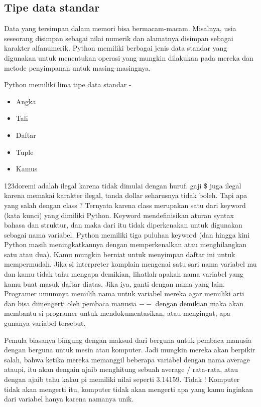 \subsection{Tipe data standar}
Data yang tersimpan dalam memori bisa bermacam-macam. Misalnya, usia seseorang disimpan sebagai nilai numerik dan alamatnya disimpan sebagai karakter alfanumerik. Python memiliki berbagai jenis data standar yang digunakan untuk menentukan operasi yang mungkin dilakukan pada mereka dan metode penyimpanan untuk masing-masingnya.

Python memiliki lima tipe data standar -
\begin{itemize}
	\item Angka
	\item Tali
	\item Daftar
	\item Tuple
	\item Kamus
\end{itemize}
123doremi adalah ilegal karena tidak dimulai dengan huruf. gaji \$ juga ilegal karena memakai karakter ilegal, tanda dollar seharusnya tidak boleh. Tapi apa yang salah dengan class ?
Ternyata karena class merupakan satu dari keyword (kata kunci) yang dimiliki Python. Keyword mendefinisikan aturan syntax bahasa dan struktur, dan maka dari itu tidak diperkenakan untuk digunakan sebagai nama variabel. 
Python memiliki tiga puluhan keyword (dan hingga kini Python masih meningkatkannya dengan memperkenalkan atau menghilangkan satu atau dua). 
Kamu mungkin berniat untuk menyimpan daftar ini untuk mempermudah. Jika si interpreter komplain mengenai satu sari nama variabel mu dan kamu tidak tahu mengapa demikian, lihatlah apakah nama variabel yang kamu buat masuk daftar diatas. Jika iya, ganti dengan nama yang lain.  
Programer umumnya memilih nama untuk variabel mereka agar memiliki arti dan bisa dimengerti oleh pembaca manusia \(--\) dengan demikian maka akan membantu si programer untuk mendokumentasikan, atau mengingat, apa gunanya variabel tersebut.  

Pemula biasanya bingung dengan maksud dari berguna untuk pembaca manusia dengan berguna untuk mesin atau komputer. Jadi mungkin mereka akan berpikir salah, bahwa ketika mereka memanggil beberapa variabel dengan nama average ataupi, itu akan dengain ajaib menghitung sebuah average / rata-rata, atau dengan ajaib tahu kalau pi memiliki nilai seperti 3.14159. Tidak ! Komputer tidak akan mengerti itu, komputer tidak akan mengerti apa yang kamu inginkan dari variabel hanya karena namanya unik. 

